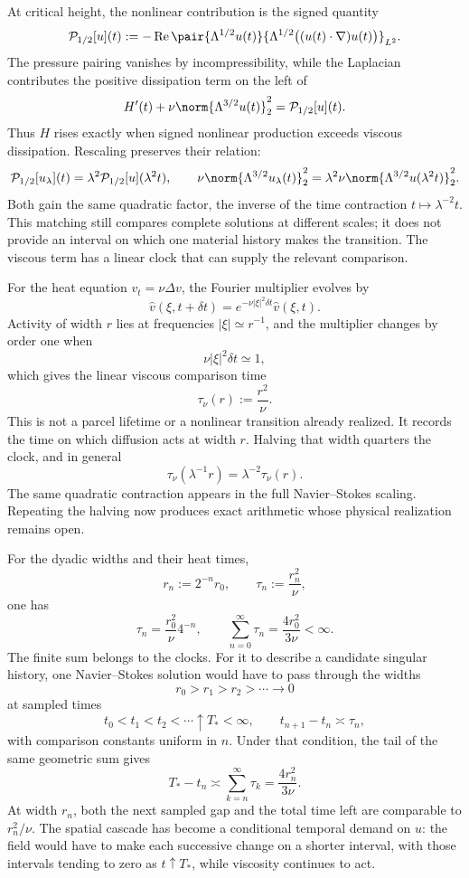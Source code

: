 
At critical height, the nonlinear contribution is the signed quantity
\[
  \mathcal P_{1/2}[u](t)
  :=
  -\operatorname{Re}
  \pair
    {\Lambda^{1/2}u(t)}
    {\Lambda^{1/2}\bigl((u(t)\cdot\nabla)u(t)\bigr)}_{L^2}.
\]
The pressure pairing vanishes by incompressibility, while the Laplacian contributes the positive dissipation term on the left of
\[
  H'(t)
  +
  \nu\norm{\Lambda^{3/2}u(t)}_2^2
  =
  \mathcal P_{1/2}[u](t).
\]
Thus \(H\) rises exactly when signed nonlinear production exceeds viscous dissipation. Rescaling preserves their relation:
\[
  \mathcal P_{1/2}[u_\lambda](t)
  =
  \lambda^2\mathcal P_{1/2}[u](\lambda^2t),
  \qquad
  \nu\norm{\Lambda^{3/2}u_\lambda(t)}_2^2
  =
  \lambda^2\nu\norm{\Lambda^{3/2}u(\lambda^2t)}_2^2.
\]
Both gain the same quadratic factor, the inverse of the time contraction \(t\mapsto\lambda^{-2}t\). This matching still compares complete solutions at different scales; it does not provide an interval on which one material history makes the transition. The viscous term has a linear clock that can supply the relevant comparison.


For the heat equation \(v_t=\nu\Delta v\), the Fourier multiplier evolves by
\[
  \widehat v(\xi,t+\delta t)
  =
  e^{-\nu|\xi|^2\delta t}\widehat v(\xi,t).
\]
Activity of width \(r\) lies at frequencies \(|\xi|\simeq r^{-1}\), and the multiplier changes by order one when
\[
  \nu|\xi|^2\delta t\simeq1,
\]
which gives the linear viscous comparison time
\[
  \tau_\nu(r)
  :=
  \frac{r^2}{\nu}.
\]
This is not a parcel lifetime or a nonlinear transition already realized. It records the time on which diffusion acts at width \(r\). Halving that width quarters the clock, and in general
\[
  \tau_\nu(\lambda^{-1}r)
  =
  \lambda^{-2}\tau_\nu(r).
\]
The same quadratic contraction appears in the full Navier--Stokes scaling. Repeating the halving now produces exact arithmetic whose physical realization remains open.


For the dyadic widths and their heat times,
\[
  r_n:=2^{-n}r_0,
  \qquad
  \tau_n:=\frac{r_n^2}{\nu},
\]
one has
\[
  \tau_n
  =
  \frac{r_0^2}{\nu}4^{-n},
  \qquad
  \sum_{n=0}^{\infty}\tau_n
  =
  \frac{4r_0^2}{3\nu}
  <
  \infty.
\]
The finite sum belongs to the clocks. For it to describe a candidate singular history, one Navier--Stokes solution would have to pass through the widths
\[
  r_0>r_1>r_2>\cdots\longrightarrow0
\]
at sampled times
\[
  t_0<t_1<t_2<\cdots\uparrow T_*<\infty,
  \qquad
  t_{n+1}-t_n\asymp\tau_n,
\]
with comparison constants uniform in \(n\). Under that condition, the tail of the same geometric sum gives
\[
  T_*-t_n
  \asymp
  \sum_{k=n}^{\infty}\tau_k
  =
  \frac{4r_n^2}{3\nu}.
\]
At width \(r_n\), both the next sampled gap and the total time left are comparable to \(r_n^2/\nu\). The spatial cascade has become a conditional temporal demand on \(u\): the field would have to make each successive change on a shorter interval, with those intervals tending to zero as \(t\uparrow T_*\), while viscosity continues to act.
